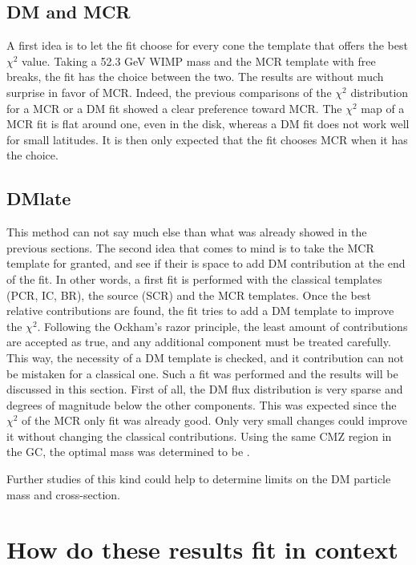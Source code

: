 \subsection{DM and MCR}

A first idea is to let the fit choose for every cone the template that offers the best $\chi^2$ value. Taking a 52.3 GeV WIMP mass and the MCR template with free breaks, the fit has the choice between the two. The results are without much surprise in favor of MCR. Indeed, the previous comparisons of the $\chi^2$ distribution for a MCR or a DM fit showed a clear preference toward MCR. The $\chi^2$ map of a MCR fit is flat around one, even in the disk, whereas a DM fit does not work well for small latitudes. It is then only expected that the fit chooses MCR when it has the choice.

\subsection{DMlate}

This method can not say much else than what was already showed in the previous sections. The second idea that comes to mind is to take the MCR template for granted, and see if their is space to add DM contribution at the end of the fit. In other words, a first fit is performed with the classical templates (PCR, IC, BR), the source (SCR) and the MCR templates. Once the best relative contributions are found, the fit tries to add a DM template to improve the $\chi^2$.
Following the Ockham's razor principle, the least amount of contributions are accepted as true, and any additional component must be treated carefully. This way, the necessity of a DM template is checked, and it contribution can not be mistaken for a classical one.
Such a fit was performed and the results will be discussed in this section. First of all, the DM flux distribution  is very sparse and degrees of magnitude below the other components. This was expected since the $\chi^2$ of the MCR only fit was already good. Only very small changes could improve it without changing the classical contributions. Using the same CMZ region in the GC, the optimal mass was determined to be .

Further studies of this kind could help to determine limits on the DM particle mass and cross-section.


\section{How do these results fit in context}
%		






